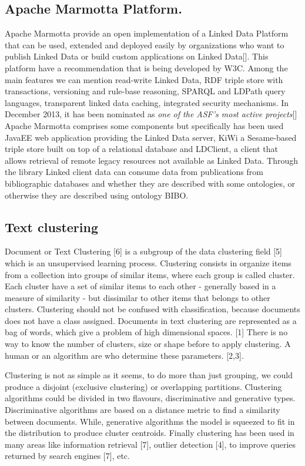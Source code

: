\documentclass[11pt]{article}
\begin{document}
\subsection{Apache Marmotta Platform.}
Apache Marmotta provide an open implementation of a Linked Data Platform that can be used, extended and deployed easily by organizations who want to publish Linked Data or build custom applications on Linked Data[]. This platform have a recommendation that is being developed by W3C. Among the main features we can mention read-write Linked Data, RDF triple store with transactions, versioning and rule-base reasoning, SPARQL and LDPath query languages, transparent linked data caching, integrated security mechanisms. In December 2013, it has been nominated as \emph{one of the ASF's most active projects}[]
Apache Marmotta comprises  some components but specifically has been used JavaEE web application providing the Linked Data server, KiWi a Sesame-based triple store built on top of a relational database and  LDClient, a client that allows retrieval of remote legacy resources not available as Linked Data. Through the library Linked client data can consume data from publications from bibliographic databases and whether they are described with some ontologies, or otherwise they are described using ontology BIBO.



\subsection{Text clustering}

Document or Text Clustering [6] is a subgroup of the data clustering field [5] which is an unsupervised learning process. Clustering consists in organize items from a collection into groups of similar items, where each group is called cluster. Each cluster have a set of similar items to each other -  generally based in a measure of similarity - but dissimilar to other items that belongs to other clusters. Clustering should not be confused with classification, because documents does not have a class assigned. Documents in text clustering are represented as a bag of words, which give a problem of high dimensional spaces. [1] There is no way to know the number of clusters, size or shape before to apply clustering. A human or an algorithm are who determine these parameters. [2,3].

Clustering is not as simple as it seems, to do more than just grouping, we could produce a disjoint (exclusive clustering) or overlapping partitions. Clustering algorithms could be divided in two flavours, discriminative and generative types. Discriminative algorithms are based on a distance metric to find a similarity between documents. While, generative algorithms the model is squeezed to fit in the distribution to produce cluster centroids. Finally clustering has been used in many areas like information retrieval [7], outlier detection [4], to improve queries returned by search engines [7], etc. 
\end{document}
